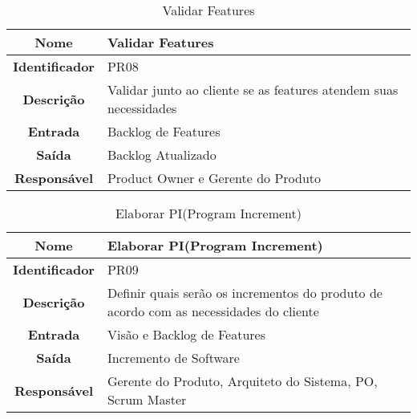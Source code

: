 {              \begin{table}[H]
                \centering
                \caption{Validar Features}
                \begin{tabular}{c|p{10cm}}
                    \hline
                    \textbf{Nome}            & Validar Features\\
                    \hline
                    \textbf{Identificador} & PR08\\
                    \hline
                    \textbf{Descrição}   & Validar junto ao cliente se as features atendem suas necessidades\\
                    \hline
                    \textbf{Entrada}           & Backlog de Features\\
                    \hline
                    \textbf{Saída}            &  Backlog Atualizado\\
                    \hline
                    \textbf{Responsável}            & Product Owner e  Gerente do Produto\\
                    \hline
                \end{tabular}
            \end{table}

              \begin{table}[H]
                \centering
                \caption{Elaborar PI(Program Increment)}
                \begin{tabular}{c|p{10cm}}
                    \hline
                    \textbf{Nome}            & Elaborar PI(Program Increment)\\
                    \hline
                    \textbf{Identificador} & PR09\\
                    \hline
                    \textbf{Descrição}   & Definir quais serão os incrementos do produto de acordo com as necessidades do cliente\\
                    \hline
                    \textbf{Entrada}           & Visão e Backlog de Features\\
                    \hline
                    \textbf{Saída}            &  Incremento de Software\\
                    \hline
                    \textbf{Responsável}            & Gerente do Produto, Arquiteto do Sistema, PO, Scrum Master\\
                    \hline
                \end{tabular}
            \end{table}

}
